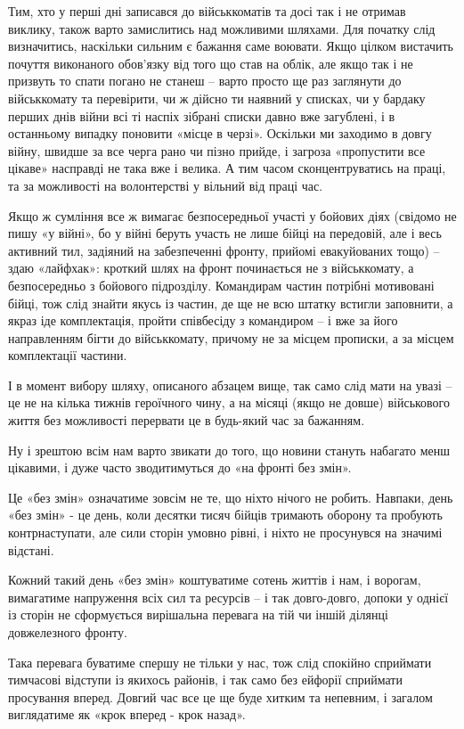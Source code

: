 Тим, хто у перші дні записався до військкоматів та досі так і не отримав
виклику, також варто замислитись над можливими шляхами. Для початку слід
визначитись, наскільки сильним є бажання саме воювати. Якщо цілком вистачить
почуття виконаного обов’язку від того що став на облік, але якщо так і не
призвуть то спати погано не станеш – варто просто ще раз заглянути до
військкомату та перевірити, чи ж дійсно ти наявний у списках, чи у бардаку
перших днів війни всі ті наспіх зібрані списки давно вже загублені, і в
останньому випадку поновити «місце в черзі». Оскільки ми заходимо в довгу
війну, швидше за все черга рано чи пізно прийде, і загроза «пропустити все
цікаве» насправді не така вже і велика. А тим часом сконцентруватись на праці,
та за можливості на волонтерстві у вільний від праці час.

Якщо ж сумління все ж вимагає безпосередньої участі у бойових діях (свідомо не
пишу «у війні», бо у війні беруть участь не лише бійці на передовій, але і весь
активний тил, задіяний на забезпеченні фронту, прийомі евакуйованих тощо) –
здаю «лайфхак»: кроткий шлях на фронт починається не з військкомату, а
безпосередньо з бойового підрозділу. Командирам частин потрібні мотивовані
бійці, тож слід знайти якусь із частин, де ще не всю штатку встигли заповнити,
а якраз іде комплектація, пройти співбесіду з командиром – і вже за його
направленням бігти до військкомату, причому не за місцем прописки, а за місцем
комплектації частини.

І в момент вибору шляху, описаного абзацем вище, так само слід мати на увазі –
це не на кілька тижнів героїчного чину, а на місяці (якщо не довше) військового
життя без можливості перервати це в будь-який час за бажанням.

Ну і зрештою всім нам варто звикати до того, що новини стануть набагато менш
цікавими, і дуже часто зводитимуться до «на фронті без змін». 

Це «без змін» означатиме зовсім не те, що ніхто нічого не робить. Навпаки, день
«без змін» - це день, коли десятки тисяч бійців тримають оборону та пробують
контрнаступати, але сили сторін умовно рівні, і ніхто не просунувся на значимі
відстані.

Кожний такий день «без змін» коштуватиме сотень життів і нам, і ворогам,
вимагатиме напруження всіх сил та ресурсів – і так довго-довго, допоки у однієї
із сторін не сформується вирішальна перевага на тій чи іншій ділянці
довжелезного фронту. 

Така перевага буватиме спершу не тільки у нас, тож слід спокійно сприймати
тимчасові відступи із якихось районів, і так само без ейфорії сприймати
просування вперед. Довгий час все це ще буде хитким та непевним, і загалом
виглядатиме як «крок вперед  - крок назад».

